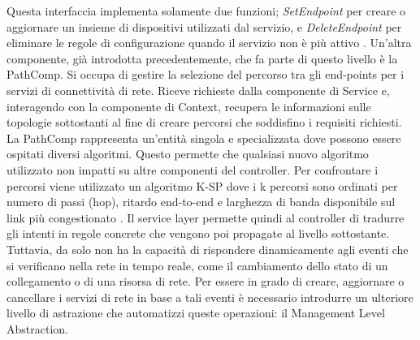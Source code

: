 Questa interfaccia implementa solamente due funzioni; \textit{SetEndpoint} per creare o aggiornare un insieme di dispositivi utilizzati dal servizio,
e \textit{DeleteEndpoint} per eliminare le regole di configurazione quando il servizio non è più attivo \cite{D32}. 
Un'altra componente, già introdotta precedentemente, che fa parte di questo livello è la PathComp. Si occupa di gestire la selezione del percorso tra gli end-points per i servizi di connettività di rete. 
Riceve richieste dalla componente di Service e, interagendo con la componente di Context, recupera le informazioni sulle topologie sottostanti al fine di creare
percorsi che soddisfino i requisiti richiesti.
\newline La PathComp rappresenta un'entità singola e specializzata dove possono essere ospitati diversi algoritmi. Questo permette che qualsiasi nuovo algoritmo utilizzato non impatti su altre componenti del controller.
Per confrontare i percorsi viene utilizzato un algoritmo K-SP dove i k percorsi sono ordinati per numero di passi (hop), ritardo end-to-end e larghezza di banda disponibile sul link più congestionato \cite{D53}. 
\newline Il service layer permette quindi al controller di tradurre gli intenti in regole concrete che vengono poi propagate al livello sottostante.
Tuttavia, da solo non ha la capacità di rispondere dinamicamente agli eventi che si verificano nella rete in tempo reale, come il cambiamento dello stato di un collegamento o di una risorsa di rete. %
Per essere in grado di creare, aggiornare o cancellare i servizi di rete in base a tali eventi è necessario introdurre un ulteriore livello di astrazione che automatizzi queste operazioni: il Management Level Abstraction.

